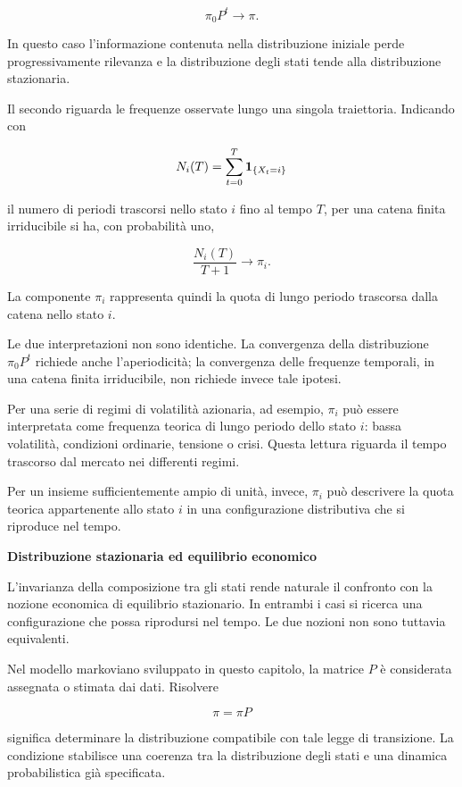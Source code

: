 \[
\pi_0P^t
\longrightarrow
\pi.
\]

In questo caso l'informazione contenuta nella distribuzione iniziale
perde progressivamente rilevanza e la distribuzione degli stati tende
alla distribuzione stazionaria.

Il secondo riguarda le frequenze osservate lungo una singola
traiettoria. Indicando con

\[
N_i(T)
=
\sum_{t=0}^{T}
\mathbf{1}_{\{X_t=i\}}
\]

il numero di periodi trascorsi nello stato \(i\) fino al tempo \(T\),
per una catena finita irriducibile si ha, con probabilit\`{a} uno,

\[
\frac{N_i(T)}{T+1}
\longrightarrow
\pi_i.
\]

La componente \(\pi_i\) rappresenta quindi la quota di lungo periodo
trascorsa dalla catena nello stato \(i\).

Le due interpretazioni non sono identiche. La convergenza della
distribuzione \(\pi_0P^t\) richiede anche l'aperiodicit\`{a}; la
convergenza delle frequenze temporali, in una catena finita
irriducibile, non richiede invece tale ipotesi.

Per una serie di regimi di volatilit\`{a} azionaria, ad esempio,
\(\pi_i\) pu\`{o} essere interpretata come frequenza teorica di lungo
periodo dello stato \(i\): bassa volatilit\`{a}, condizioni ordinarie,
tensione o crisi. Questa lettura riguarda il tempo trascorso dal
mercato nei differenti regimi.

Per un insieme sufficientemente ampio di unit\`{a}, invece, \(\pi_i\)
pu\`{o} descrivere la quota teorica appartenente allo stato \(i\) in
una configurazione distributiva che si riproduce nel tempo.

\noindent\textbf{Distribuzione stazionaria ed equilibrio economico}

L'invarianza della composizione tra gli stati rende naturale il
confronto con la nozione economica di equilibrio stazionario. In
entrambi i casi si ricerca una configurazione che possa riprodursi nel
tempo. Le due nozioni non sono tuttavia equivalenti.

Nel modello markoviano sviluppato in questo capitolo, la matrice \(P\)
\`{e} considerata assegnata o stimata dai dati. Risolvere

\[
\pi=\pi P
\]

significa determinare la distribuzione compatibile con tale legge di
transizione. La condizione stabilisce una coerenza tra la distribuzione
degli stati e una dinamica probabilistica gi\`{a} specificata.

